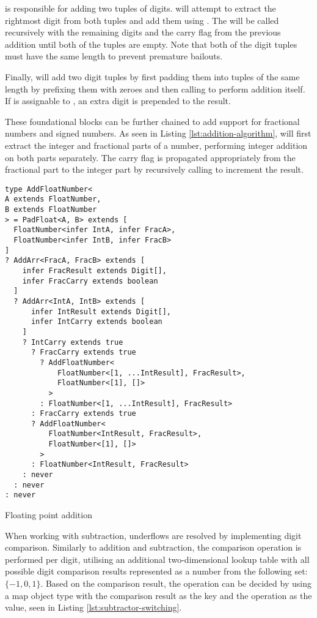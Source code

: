  is responsible for adding two tuples of digits.  will attempt to extract the rightmost digit from both tuples and add them using . The  will be called recursively with the remaining digits and the carry flag from the previous addition until both of the tuples are empty. Note that both of the digit tuples must have the same length to prevent premature bailouts.

Finally,  will add two digit tuples by first padding them into tuples of the same length by prefixing them with zeroes and then calling  to perform addition itself. If  is assignable to , an extra  digit is prepended to the result.

These foundational blocks can be further chained to add support for fractional numbers and signed numbers. As seen in Listing \ref{lst:addition-algorithm},  will first extract the integer and fractional parts of a number, performing integer addition on both parts separately. The carry flag is propagated appropriately from the fractional part to the integer part by recursively calling  to increment the result.

\begin{listing}[ht!]
  \begin{verbatim}
type AddFloatNumber<
A extends FloatNumber,
B extends FloatNumber
> = PadFloat<A, B> extends [
  FloatNumber<infer IntA, infer FracA>,
  FloatNumber<infer IntB, infer FracB>
]
? AddArr<FracA, FracB> extends [
    infer FracResult extends Digit[],
    infer FracCarry extends boolean
  ]
  ? AddArr<IntA, IntB> extends [
      infer IntResult extends Digit[],
      infer IntCarry extends boolean
    ]
    ? IntCarry extends true
      ? FracCarry extends true
        ? AddFloatNumber<
            FloatNumber<[1, ...IntResult], FracResult>,
            FloatNumber<[1], []>
          >
        : FloatNumber<[1, ...IntResult], FracResult>
      : FracCarry extends true
      ? AddFloatNumber<
          FloatNumber<IntResult, FracResult>,
          FloatNumber<[1], []>
        >
      : FloatNumber<IntResult, FracResult>
    : never
  : never
: never
\end{verbatim}
  \caption{Floating point addition}\label{lst:addition-float}
\end{listing}

When working with subtraction, underflows are resolved by implementing digit comparison. Similarly to addition and subtraction, the comparison operation is performed per digit, utilising an additional two-dimensional lookup table with all possible digit comparison results represented as a number from the following set: $\{ -1, 0, 1 \}$. Based on the comparison result, the operation can be decided by using a map object type with the comparison result as the key and the operation as the value, seen in Listing \ref{lst:subtractor-switching}.

